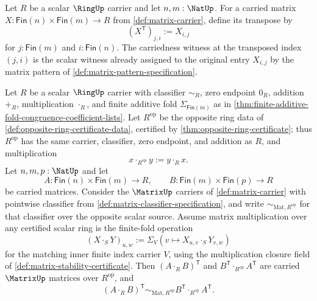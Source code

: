 \begin{definition}
\label{def:matrix-transpose-certified-scalar-carrier}
Let $R$ be a scalar $\RingUp$ carrier and let $n,m:\NatUp$. For a carried matrix $X:\mathsf{Fin}(n)\times\mathsf{Fin}(m)\to R$ from \autoref{def:matrix-carrier}, define its transpose by
$$
(X^{\mathsf{T}})_{j,i}:=X_{i,j}
$$
for $j:\mathsf{Fin}(m)$ and $i:\mathsf{Fin}(n)$. The carriedness witness at the transposed index $(j,i)$ is the scalar witness already assigned to the original entry $X_{i,j}$ by the matrix pattern of \autoref{def:matrix-pattern-specification}.
\end{definition}

\begin{theorem}
\label{thm:matrix-transpose-reverses-product-over-opposite-ring}
Let $R$ be a scalar $\RingUp$ carrier with classifier $\sim_R$, zero endpoint $0_R$, addition $+_R$, multiplication $\cdot_R$, and finite additive fold $\Sigma_{\mathsf{Fin}(m)}$ as in \autoref{thm:finite-additive-fold-congruence-coefficient-lists}. Let $R^{\mathrm{op}}$ be the opposite ring data of \autoref{def:opposite-ring-certificate-data}, certified by \autoref{thm:opposite-ring-certificate}; thus $R^{\mathrm{op}}$ has the same carrier, classifier, zero endpoint, and addition as $R$, and multiplication
$$
x\cdot_{R^{\mathrm{op}}}y:=y\cdot_Rx.
$$
Let $n,m,p:\NatUp$ and let
$$
A:\mathsf{Fin}(n)\times\mathsf{Fin}(m)\to R,
\qquad
B:\mathsf{Fin}(m)\times\mathsf{Fin}(p)\to R
$$
be carried matrices. Consider the $\MatrixUp$ carriers of \autoref{def:matrix-carrier} with pointwise classifier from \autoref{def:matrix-classifier-specification}, and write $\sim_{\mathrm{Mat},R^{\mathrm{op}}}$ for that classifier over the opposite scalar source. Assume matrix multiplication over any certified scalar ring is the finite-fold operation
$$
(X\cdot_S Y)_{u,w}:=\Sigma_V(v\mapsto X_{u,v}\cdot_SY_{v,w})
$$
for the matching inner finite index carrier $V$, using the multiplication closure field of \autoref{def:matrix-stability-certificate}. Then $(A\cdot_RB)^{\mathsf{T}}$ and $B^{\mathsf{T}}\cdot_{R^{\mathrm{op}}}A^{\mathsf{T}}$ are carried $\MatrixUp$ matrices over $R^{\mathrm{op}}$, and
$$
(A\cdot_RB)^{\mathsf{T}}
\sim_{\mathrm{Mat},R^{\mathrm{op}}}
B^{\mathsf{T}}\cdot_{R^{\mathrm{op}}}A^{\mathsf{T}}.
$$
\end{theorem}
